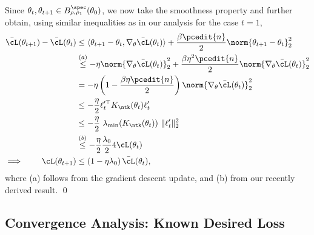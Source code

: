 Since $\theta_t,\theta_{t+1}\in B_{\rho,\rho_1}^{\spec}(\theta_0)$, we now take the smoothness property and further obtain, using similar inequalities as in our analysis for the case $t=1$,
\begin{equation}
\begin{aligned}
\bar{\cL}(\theta_{t+1})-\bar{\cL}(\theta_{t})&\leq \langle \theta_{t+1}-\theta_t,\nabla_{\theta}\bar{\cL}(\theta_t)\rangle  +\frac{\beta\pcedit{n}}{2}\norm{\theta_{t+1}-\theta_t}^2_2\\
& \overset{(a)}{\leq} -\eta\norm{\nabla_\theta \bar{\cL}(\theta_t)}_2^2 +\frac{\beta\eta^2\pcedit{n}}{2}\norm{\nabla_\theta \bar{\cL}(\theta_t)}^2_2\\
&= - \eta \left(1 - \frac{\beta\eta\pcedit{n}}{2} \right)\norm{\nabla_\theta \bar{\cL}(\theta_t)}^2_2\\
%
&\leq - \frac{\eta}{2} \ell_t'^\top K_{\ntk}(\theta_t)\ell_t' \\
&\leq - \frac{\eta}{2} ~\lambda_{\min}(K_{\ntk}(\theta_t))~ \|\ell'_t \|_2^2 \\
&\overset{(b)}{\leq} - \frac{\eta}{2}  \frac{\lambda_0}{2} 4 \cL(\theta_t) \\
\implies \qquad \cL(\theta_{t+1})&\leq \left(1- \eta  \lambda_0 \right) \bar{\cL}(\theta_t),
\end{aligned}
\end{equation}
where (a) follows from the gradient descent update, and (b) from our recently derived result. \qed 


\subsection{Convergence Analysis: Known Desired Loss} 


